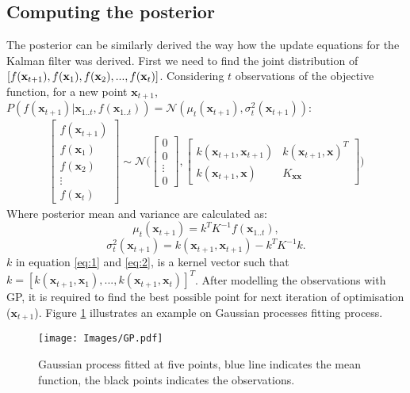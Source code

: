 \subsection{Computing the posterior}
The posterior can be similarly derived the way how the update equations for the Kalman filter was derived. First we need to find the joint distribution of $[f(\textbf{x}_{t+1}),f(\textbf{x}_1),\\ f(\textbf{x}_2),...,f(\textbf{x}_t)]$.
Considering $t$  observations of the objective function, for a new point $\textbf{x}_{t+1}$, $P(f(\textbf{x}_{t+1})|\textbf{x}_{1..t},f(\textbf{x}_{1..t})) = \mathcal{N}(\mu_t(\textbf{x}_{t+1}),\sigma^2_t(\textbf{x}_{t+1}))$:
\begin{align}
   \begin{bmatrix} 
    f(\textbf{x}_{t+1})\\
    f(\textbf{x}_{1})\\
    f(\textbf{x}_{2})\\
    \vdots\\
    f(\textbf{x}_{t})
    \end{bmatrix} \sim \mathcal{N} \Bigg(    
   \begin{bmatrix} 
    0\\
    0\\
    \vdots\\
    0
 	\end{bmatrix},\begin{bmatrix} 
    k(\textbf{x}_{t+1},\textbf{x}_{t+1}) & k(\textbf{x}_{t+1},\textbf{x})^T\\
    k(\textbf{x}_{t+1},\textbf{x}) & K_{\textbf{xx}}
    \end{bmatrix}\Bigg)
\end{align}
Where posterior mean and variance are calculated as:
\begin{equation}
\mu_t(\textbf{x}_{t+1}) = k^T  K^{-1}  f(\textbf{x}_{1..t}), 
\label{eq:1}
\end{equation}
\begin{equation}
\sigma^2_t(\textbf{x}_{t+1}) = k(\textbf{x}_{t+1},\textbf{x}_{t+1}) - k^T K^{-1} k.
\label{eq:2}
\end{equation}
$k$ in equation \ref{eq:1} and \ref{eq:2}, is a kernel vector such that $k = [k(\textbf{x}_{t+1},\textbf{x}_1),...,k(\textbf{x}_{t+1},\textbf{x}_t)]^T$.
After modelling the observations with GP, it is required to find the best possible point for next iteration of optimisation ($\textbf{x}_{t+1}$).
Figure \ref{fig:gp} illustrates an example on Gaussian processes fitting process.
\begin{figure}[h]
\centering
\texttt{[image: Images/GP.pdf]}
\caption{Gaussian process fitted at five points, blue line indicates the mean function, the black points indicates the observations.}
\label{fig:gp}
\end{figure}


